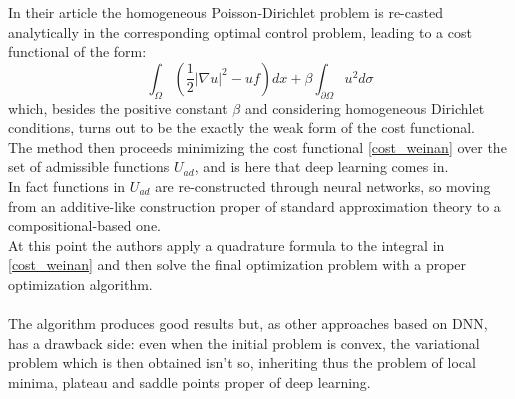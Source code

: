 \documentclass[12pt, a4paper]{report}
\theoremstyle{definition}
\begin{document}
In their article the homogeneous Poisson-Dirichlet problem is re-casted analytically in the corresponding optimal control problem, leading to a cost functional of the form:
\begin{equation}\label{cost_weinan}
\int_{\Omega}\left(\frac{1}{2} |\nabla u|^2 - uf \right)dx + \beta \int_{\partial\Omega}u^2 d\sigma
\end{equation}
which, besides the positive constant $\beta$ and considering homogeneous Dirichlet conditions, turns out to be the exactly the weak form of the \cite{Kailai} cost functional.\\
The method then proceeds minimizing the cost functional \eqref{cost_weinan} over the set of admissible functions $U_{ad}$, and is here that deep learning comes in. \\
In fact functions in $U_{ad}$ are re-constructed through neural networks, so moving from an additive-like construction proper of standard approximation theory to a compositional-based one.\\
At this point the authors apply a quadrature formula to the integral in \eqref{cost_weinan} and then solve the final optimization problem with a proper optimization algorithm.\\\\
\noindent The algorithm produces good results but, as other approaches based on DNN, has a drawback side: even when the initial problem is convex, the variational problem which is then obtained isn't so, inheriting thus the problem of local minima, plateau and saddle points proper of deep learning.
\end{document}
